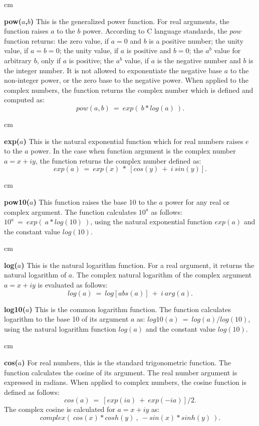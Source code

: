  cm

{\bf pow($a$,$b$)}\hfil\break
This is the generalized power function.
For real arguments, the function raises $a$ to the $b$ power.
According to C language standards, the $pow$ function returns:
the zero value, if $a=0$ and $b$ is a positive number;
the unity value, if $a=b=0$;
the unity value, if $a$ is positive and $b=0$;
the $a^b$ value for arbitrary $b$, only if $a$ is positive;
the $a^b$ value, if $a$ is the negative number and $b$ is the integer number.  
It is not allowed to exponentiate the negative base $a$
to the non-integer power,
or the zero base to the negative power.
When applied to the complex numbers,
the function returns the complex number
which is defined and computed as:
$$pow(a,b)\ =\ exp(\ b*log(a)\ ) .$$

 cm

{\bf exp($a$)}\hfil\break
This is the natural exponential function which for real numbers
raises $e$ to the $a$ power. In the case when function argument
is the complex number $a=x+iy$, the function
returns the complex number defined as: 
$$exp(a)\ =\ exp(x)\ *\ [cos(y)\ +\ i\ sin(y)] .$$

 cm

{\bf pow10($a$)}\hfil\break
This function raises the base 10 to the $a$ power 
for any real or complex argument.
The function calculates $10^a$ as follows:
$10^{a}\ =\ exp(\ a * log(10)\ ) $,
using the natural exponential function $exp(a)$
and the constant value $log(10)$.

 cm

{\bf log($a$)}\hfil\break
This is the natural logarithm function.
For a real argument, it returns the natural logarithm of $a$.
The complex natural logarithm of the complex argument $a=x+iy$
is evaluated as follows:
$$log(a)\ =\ log[abs(a)]\ +\ i\ arg(a) .$$

\newpage

{\bf log10($a$)}\hfil\break
This is the common logarithm function.
The function calculates logarithm to the base 10 of its argument $a$
as: 
$log10(a)\ =\ log(a)/log(10)$,
using the natural logarithm function $log(a)$ and 
the constant value $log(10)$.

 cm

{\bf cos($a$)}\hfil\break
For real numbers, this is the standard trigonometric function.
The function calculates the cosine of its argument.
The real number argument is expressed in radians.
When applied to complex numbers, 
the cosine function is defined as follows: 
$$cos(a)\ =\ [exp(ia)\ +\ exp(-ia)]/2 .$$
The complex cosine is calculated for $a=x+iy$ as:
$$complex(\
cos(x)*cosh(y)\ ,\ -sin(x)*sinh(y)\
) .$$

